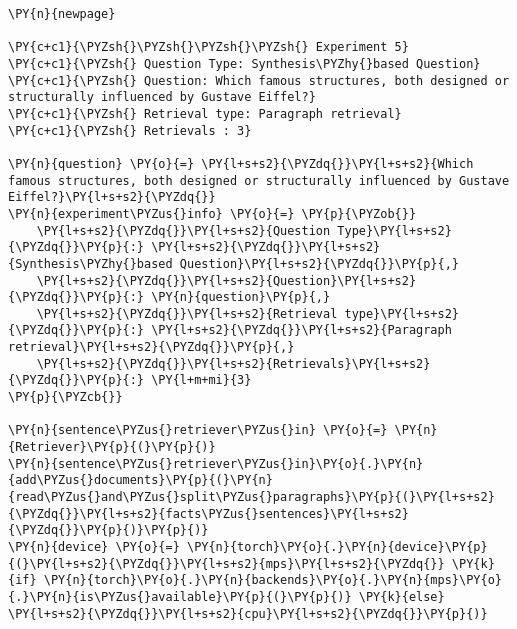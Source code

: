 \documentclass[11pt]{wseas}
\begin{document}
    \begin{tcolorbox}[breakable, size=fbox, boxrule=1pt, pad at break*=1mm,colback=cellbackground, colframe=cellborder]
\begin{Verbatim}[commandchars=\\\{\}]
\PY{n}{newpage}

\PY{c+c1}{\PYZsh{}\PYZsh{}\PYZsh{}\PYZsh{} Experiment 5}
\PY{c+c1}{\PYZsh{} Question Type: Synthesis\PYZhy{}based Question}
\PY{c+c1}{\PYZsh{} Question: Which famous structures, both designed or structurally influenced by Gustave Eiffel?}
\PY{c+c1}{\PYZsh{} Retrieval type: Paragraph retrieval}
\PY{c+c1}{\PYZsh{} Retrievals : 3}

\PY{n}{question} \PY{o}{=} \PY{l+s+s2}{\PYZdq{}}\PY{l+s+s2}{Which famous structures, both designed or structurally influenced by Gustave Eiffel?}\PY{l+s+s2}{\PYZdq{}}
\PY{n}{experiment\PYZus{}info} \PY{o}{=} \PY{p}{\PYZob{}}
    \PY{l+s+s2}{\PYZdq{}}\PY{l+s+s2}{Question Type}\PY{l+s+s2}{\PYZdq{}}\PY{p}{:} \PY{l+s+s2}{\PYZdq{}}\PY{l+s+s2}{Synthesis\PYZhy{}based Question}\PY{l+s+s2}{\PYZdq{}}\PY{p}{,}
    \PY{l+s+s2}{\PYZdq{}}\PY{l+s+s2}{Question}\PY{l+s+s2}{\PYZdq{}}\PY{p}{:} \PY{n}{question}\PY{p}{,}
    \PY{l+s+s2}{\PYZdq{}}\PY{l+s+s2}{Retrieval type}\PY{l+s+s2}{\PYZdq{}}\PY{p}{:} \PY{l+s+s2}{\PYZdq{}}\PY{l+s+s2}{Paragraph retrieval}\PY{l+s+s2}{\PYZdq{}}\PY{p}{,}
    \PY{l+s+s2}{\PYZdq{}}\PY{l+s+s2}{Retrievals}\PY{l+s+s2}{\PYZdq{}}\PY{p}{:} \PY{l+m+mi}{3}
\PY{p}{\PYZcb{}}

\PY{n}{sentence\PYZus{}retriever\PYZus{}in} \PY{o}{=} \PY{n}{Retriever}\PY{p}{(}\PY{p}{)}
\PY{n}{sentence\PYZus{}retriever\PYZus{}in}\PY{o}{.}\PY{n}{add\PYZus{}documents}\PY{p}{(}\PY{n}{read\PYZus{}and\PYZus{}split\PYZus{}paragraphs}\PY{p}{(}\PY{l+s+s2}{\PYZdq{}}\PY{l+s+s2}{facts\PYZus{}sentences}\PY{l+s+s2}{\PYZdq{}}\PY{p}{)}\PY{p}{)}
\PY{n}{device} \PY{o}{=} \PY{n}{torch}\PY{o}{.}\PY{n}{device}\PY{p}{(}\PY{l+s+s2}{\PYZdq{}}\PY{l+s+s2}{mps}\PY{l+s+s2}{\PYZdq{}} \PY{k}{if} \PY{n}{torch}\PY{o}{.}\PY{n}{backends}\PY{o}{.}\PY{n}{mps}\PY{o}{.}\PY{n}{is\PYZus{}available}\PY{p}{(}\PY{p}{)} \PY{k}{else} \PY{l+s+s2}{\PYZdq{}}\PY{l+s+s2}{cpu}\PY{l+s+s2}{\PYZdq{}}\PY{p}{)}


\end{Verbatim}
\end{tcolorbox}
\end{document}

